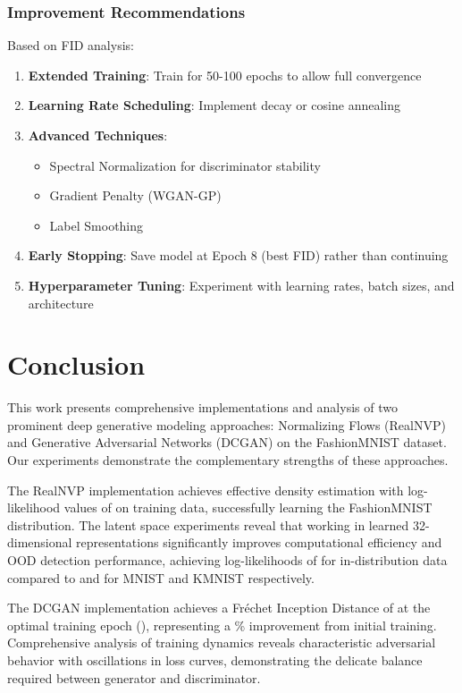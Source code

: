 \documentclass[conference,12pt]{IEEEtran}
\begin{document}
\subsubsection{Improvement Recommendations}

Based on FID analysis:

\begin{enumerate}
    \item \textbf{Extended Training}: Train for 50-100 epochs to allow full convergence
    \item \textbf{Learning Rate Scheduling}: Implement decay or cosine annealing
    \item \textbf{Advanced Techniques}:
    \begin{itemize}
        \item Spectral Normalization for discriminator stability
        \item Gradient Penalty (WGAN-GP)
        \item Label Smoothing
    \end{itemize}
    \item \textbf{Early Stopping}: Save model at Epoch 8 (best FID) rather than continuing
    \item \textbf{Hyperparameter Tuning}: Experiment with learning rates, batch sizes, and architecture
\end{enumerate}

\section{Conclusion}

This work presents comprehensive implementations and analysis of two prominent deep generative modeling approaches: Normalizing Flows (RealNVP) and Generative Adversarial Networks (DCGAN) on the FashionMNIST dataset. Our experiments demonstrate the complementary strengths of these approaches.

The RealNVP implementation achieves effective density estimation with log-likelihood values of \PixelTrainLL{} on training data, successfully learning the FashionMNIST distribution. The latent space experiments reveal that working in learned 32-dimensional representations significantly improves computational efficiency and OOD detection performance, achieving log-likelihoods of \LatentTestLL{} for in-distribution data compared to \LatentMNISTLL{} and \LatentKMNISTLL{} for MNIST and KMNIST respectively.

The DCGAN implementation achieves a Fréchet Inception Distance of \BestFID{} at the optimal training epoch (\BestFIDEpoch), representing a \BestFIDImprovePct\% improvement from initial training. Comprehensive analysis of training dynamics reveals characteristic adversarial behavior with oscillations in loss curves, demonstrating the delicate balance required between generator and discriminator.
\end{document}
